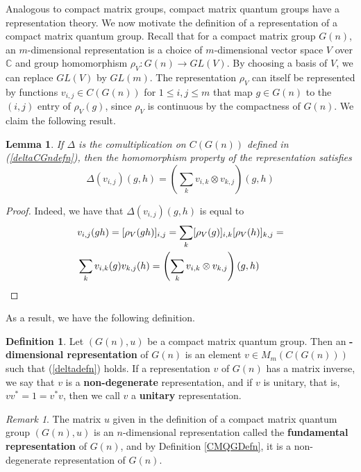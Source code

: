 \documentclass{article}
\theoremstyle{plain}
\newtheorem{lemma}[theorem]{Lemma}
\theoremstyle{definition}
\newtheorem{definition}[theorem]{Definition}
\theoremstyle{remark}
\newtheorem{remark}[theorem]{Remark}
\begin{document}
Analogous to compact matrix groups, compact matrix quantum groups 
have a representation theory. 
We now motivate the definition of a 
representation of a compact matrix quantum group.
Recall that for a compact matrix group $G(n)$, 
an $m$-dimensional representation is a choice of $m$-dimensional vector space $V$ 
over $\mathbb{C}$ and group homomorphism $\rho_V: G(n) \rightarrow GL(V)$.
By choosing a basis of $V$, we can replace $GL(V)$ by $GL(m)$.
The representation $\rho_V$ can itself be represented by functions 
$v_{i,j} \in C(G(n))$ 
for $1 \leq i, j \leq m$
that map $g \in G(n)$ to the $(i,j)$ entry of $\rho_V(g)$, 
since $\rho_V$ is continuous by the compactness of $G(n)$.
We claim the following result.
\begin{lemma}
	If $\Delta$ is the comultiplication on 
$C(G(n))$ defined in (\ref{deltaCGndefn}), then
	the homomorphism property of the representation satisfies
\begin{equation} \label{comultprop}
	\Delta(v_{i,j})(g, h)
	=
	\left(
	\sum_k 
	v_{i,k} \otimes v_{k,j}
	\right)
	(g, h)
\end{equation}
\end{lemma}

\begin{proof}
Indeed, we have that $\Delta(v_{i,j})(g, h)$ is equal to
\begin{align} 
	& v_{i,j}(gh)
	=
	[\rho_V(gh)]_{i,j}
	= 
	\sum_k 
	[\rho_V(g)]_{i,k}
	[\rho_V(h)]_{k,j} =  \nonumber \\
	&
	\sum_k 
	v_{i,k}(g)
	v_{k,j}(h)
	=
	\left(
	\sum_k 
	v_{i,k} \otimes v_{k,j}
	\right)
	(g, h) \nonumber \qedhere
\end{align}
\end{proof}

As a result, we have the following definition. 
\begin{definition}
	Let $(G(n), u)$ be a compact matrix quantum group. 
	Then an \textbf{-dimensional representation} of $G(n)$ 
	is an element $v \in M_m(C(G(n)))$ such that (\ref{deltadefn}) holds.
	If a representation $v$ of $G(n)$ has a matrix inverse, we say that 
	$v$ is a \textbf{non-degenerate} representation, and if $v$ is unitary,
	that is, $vv^* = 1 = v^*v$, then we call $v$ a \textbf{unitary} representation.
\end{definition}

\begin{remark}
	The matrix $u$ given in the definition of a compact matrix 
	quantum group $(G(n), u)$ is an $n$-dimensional representation 
	called the \textbf{fundamental representation} of $G(n)$, and
	by Definition \ref{CMQGDefn}, it is a non-degenerate representation of $G(n)$.
\end{remark}
\end{document}
